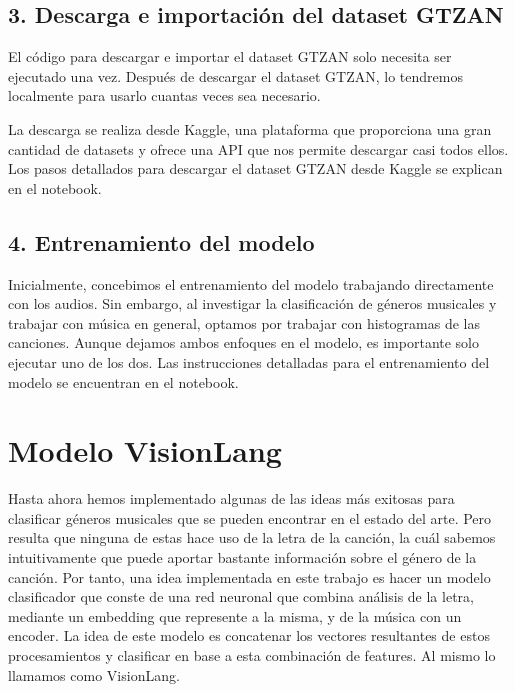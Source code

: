 \documentclass[colorinlistoftodos,twoside,twocolumn,10pt]{article} %
\begin{document}
\subsection*{3. Descarga e importación del dataset GTZAN}

El código para descargar e importar el dataset GTZAN solo necesita ser ejecutado una vez. Después de descargar el dataset GTZAN, lo tendremos localmente para usarlo cuantas veces sea necesario.

La descarga se realiza desde Kaggle, una plataforma que proporciona una gran cantidad de datasets y ofrece una API que nos permite descargar casi todos ellos. Los pasos detallados para descargar el dataset GTZAN desde Kaggle se explican en el notebook.

\subsection*{4. Entrenamiento del modelo}

Inicialmente, concebimos el entrenamiento del modelo trabajando directamente con los audios. Sin embargo, al investigar la clasificación de géneros musicales y trabajar con música en general, optamos por trabajar con histogramas de las canciones. Aunque dejamos ambos enfoques en el modelo, es importante solo ejecutar uno de los dos. Las instrucciones detalladas para el entrenamiento del modelo se encuentran en el notebook.

\section{Modelo VisionLang}

Hasta ahora hemos implementado algunas de las ideas m\'as exitosas para clasificar g\'eneros musicales que se pueden encontrar en el estado del arte. Pero resulta que ninguna de estas hace uso de la letra de la canci\'on, la cu\'al sabemos intuitivamente que puede aportar bastante informaci\'on sobre el g\'enero de la canci\'on. Por tanto, una idea implementada en este trabajo es hacer un modelo clasificador que conste de una red neuronal que combina análisis de la letra, mediante un embedding que represente a la misma, y de la música con un encoder. La idea de este modelo es concatenar los vectores resultantes de estos procesamientos y clasificar en base a esta combinación de features. Al mismo lo llamamos como VisionLang.
\end{document}
